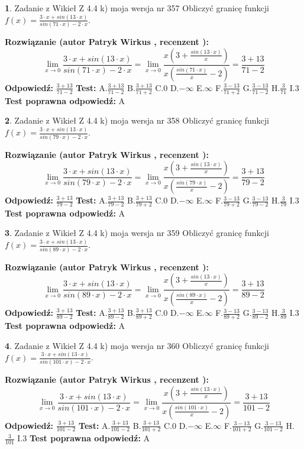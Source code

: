 \documentclass[12pt, a4paper]{article}
\theoremstyle{definition} %
\newtheorem{zad}{}
\newcommand{\zadStart}[1]{\begin{zad}#1\newline}
\newcommand{\zadStop}{\end{zad}}
\newcommand{\rozwStart}[2]{\noindent \textbf{Rozwiązanie (autor #1 , recenzent #2): }\newline}
\newcommand{\rozwStop}{\newline}
\newcommand{\odpStart}{\noindent \textbf{Odpowiedź:}\newline}
\newcommand{\odpStop}{\newline}
\newcommand{\testStart}{\noindent \textbf{Test:}\newline}
\newcommand{\testStop}{\newline}
\newcommand{\kluczStart}{\noindent \textbf{Test poprawna odpowiedź:}\newline}
\newcommand{\kluczStop}{\newline}
\begin{document}
\zadStart{Zadanie z Wikieł Z 4.4 k) moja wersja nr 357}
Obliczyć granicę funkcji $f(x)=\frac{3\cdot x +sin(13\cdot x)}{sin(71\cdot x) -2\cdot x}$.
\zadStop
\rozwStart{Patryk Wirkus}{}
$$\lim\limits_{x\to 0}\frac{3\cdot x +sin(13\cdot x)}{sin(71\cdot x) -2\cdot x}
=\lim\limits_{x\to 0}\frac{x(3+\frac{sin(13\cdot x)}{x})}{x(\frac{sin(71\cdot x)}{x}-2)}
=\frac{3+13}{71-2}$$
\rozwStop
\odpStart
$\frac{3+13}{71-2}$
\odpStop
\testStart
A.$\frac{3+13}{71-2}$
B.$\frac{3+13}{71+2}$
C.$0$
D.$-\infty$
E.$\infty$
F.$\frac{3-13}{71+2}$
G.$\frac{3-13}{71-2}$
H.$\frac{3}{71}$
I.$3$
\testStop
\kluczStart
A
\kluczStop



\zadStart{Zadanie z Wikieł Z 4.4 k) moja wersja nr 358}
Obliczyć granicę funkcji $f(x)=\frac{3\cdot x +sin(13\cdot x)}{sin(79\cdot x) -2\cdot x}$.
\zadStop
\rozwStart{Patryk Wirkus}{}
$$\lim\limits_{x\to 0}\frac{3\cdot x +sin(13\cdot x)}{sin(79\cdot x) -2\cdot x}
=\lim\limits_{x\to 0}\frac{x(3+\frac{sin(13\cdot x)}{x})}{x(\frac{sin(79\cdot x)}{x}-2)}
=\frac{3+13}{79-2}$$
\rozwStop
\odpStart
$\frac{3+13}{79-2}$
\odpStop
\testStart
A.$\frac{3+13}{79-2}$
B.$\frac{3+13}{79+2}$
C.$0$
D.$-\infty$
E.$\infty$
F.$\frac{3-13}{79+2}$
G.$\frac{3-13}{79-2}$
H.$\frac{3}{79}$
I.$3$
\testStop
\kluczStart
A
\kluczStop



\zadStart{Zadanie z Wikieł Z 4.4 k) moja wersja nr 359}
Obliczyć granicę funkcji $f(x)=\frac{3\cdot x +sin(13\cdot x)}{sin(89\cdot x) -2\cdot x}$.
\zadStop
\rozwStart{Patryk Wirkus}{}
$$\lim\limits_{x\to 0}\frac{3\cdot x +sin(13\cdot x)}{sin(89\cdot x) -2\cdot x}
=\lim\limits_{x\to 0}\frac{x(3+\frac{sin(13\cdot x)}{x})}{x(\frac{sin(89\cdot x)}{x}-2)}
=\frac{3+13}{89-2}$$
\rozwStop
\odpStart
$\frac{3+13}{89-2}$
\odpStop
\testStart
A.$\frac{3+13}{89-2}$
B.$\frac{3+13}{89+2}$
C.$0$
D.$-\infty$
E.$\infty$
F.$\frac{3-13}{89+2}$
G.$\frac{3-13}{89-2}$
H.$\frac{3}{89}$
I.$3$
\testStop
\kluczStart
A
\kluczStop



\zadStart{Zadanie z Wikieł Z 4.4 k) moja wersja nr 360}
Obliczyć granicę funkcji $f(x)=\frac{3\cdot x +sin(13\cdot x)}{sin(101\cdot x) -2\cdot x}$.
\zadStop
\rozwStart{Patryk Wirkus}{}
$$\lim\limits_{x\to 0}\frac{3\cdot x +sin(13\cdot x)}{sin(101\cdot x) -2\cdot x}
=\lim\limits_{x\to 0}\frac{x(3+\frac{sin(13\cdot x)}{x})}{x(\frac{sin(101\cdot x)}{x}-2)}
=\frac{3+13}{101-2}$$
\rozwStop
\odpStart
$\frac{3+13}{101-2}$
\odpStop
\testStart
A.$\frac{3+13}{101-2}$
B.$\frac{3+13}{101+2}$
C.$0$
D.$-\infty$
E.$\infty$
F.$\frac{3-13}{101+2}$
G.$\frac{3-13}{101-2}$
H.$\frac{3}{101}$
I.$3$
\testStop
\kluczStart
A
\kluczStop
\end{document}
